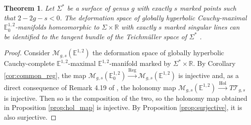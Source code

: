 \documentclass[a4paper,12pt]{article}
\def\M{\mathcal{M}}
\def\T{\mathcal{T}}
\def\RR{\mathbb{R}}
\newcommand{\mass}[1]{{\mathbb E}^{1,2}_{#1}}
\def\Reg{\mathrm{Reg}}
\def\reg{\Reg}
\newtheorem{theo}{Theorem}    %
\begin{document}
\begin{theo}\label{btzthm:princ}\label{theo:princ} Let $\Sigma^*$ be a surface of genus $g$ with exactly $s$ marked points such that $2-2g-s<0$. The deformation space of globally hyperbolic Cauchy-maximal $\mass{0}$-manifolds homeomorphic to $\Sigma\times \RR$ with exactly $s$ marked singular lines can be identified to the tangent bundle of the Teichmüller space of $\Sigma^*$ .
\end{theo}
\begin{proof} 
Consider $\M_{g,s}(\mass{})$ the deformation space of globally hyperbolic Cau\-chy-complete $\mass{}$-maximal $\mass{}$-manifold marked by $\Sigma^*\times \RR$. 
 By Corol\-la\-ry \ref{cor:common_reg}, the map $\M_{g,s}(\mass{0})\xrightarrow{\reg}\M_{g,s}(\mass{})$ is injective and, as a direct 
 consequence of  Remark 4.19  of 
 \cite{barbot_globally_2004}, the holonomy map $ \M_{g,s}(\mass{})\xrightarrow{~\mathrm{Hol}~} T\T_{g,s}$ is injective. Then so is the composition of the two, so the holonomy map obtained in Proposition \ref{prop:hol_map} is injective. By Proposition \ref{prop:surjective},  it is also surjective.
\end{proof}




	
\end{document}
